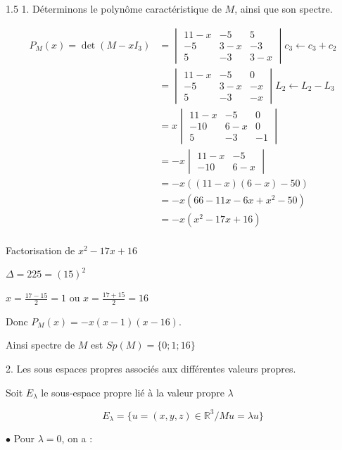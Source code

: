 \documentclass[12pt]{article}
\begin{document}
\begin{spacing}{1.5}
1. Déterminons le polynôme caractéristique de $M$, ainsi que son spectre.

\begin{align*}
P_M(x)=\det(M-xI_3)&=\begin{vmatrix}
11-x & -5 & 5 \\ 
-5 & 3-x & -3 \\ 
5 & -3 & 3-x
\end{vmatrix}c_3\leftarrow c_3+c_2\\
&=\begin{vmatrix}
11-x & -5 & 0 \\ 
-5 & 3-x & -x \\ 
5 & -3 & -x
\end{vmatrix}L_2\leftarrow L_2-L_3\\
&=x\begin{vmatrix}
11-x & -5 & 0 \\ 
-10 & 6-x & 0 \\ 
5 & -3 & -1
\end{vmatrix}\\
&=-x\begin{vmatrix}
11-x & -5 \\
-10 & 6-x 
\end{vmatrix}\\
&=-x((11-x)(6-x)-50)\\
&=-x(66-11x-6x+x^2-50)\\
&=-x(x^2-17x+16)\\
\end{align*}

Factorisation de $x^2-17x+16$

$\Delta=225=(15)^2$

$x=\frac{17-15}{2}=1$ ou $x=\frac{17+15}{2}=16$

Donc $P_M(x)=-x(x-1)(x-16)$.

Ainsi spectre de $M$ est $Sp(M)=\{0;1;16\}$

2. Les sous espaces propres associés aux différentes valeurs propres.

Soit $E_\lambda$ le sous-espace propre lié à la valeur propre $\lambda$

\[
E_\lambda=\{u=(x,y,z)\in \mathbb{R}^3/Mu=\lambda u\}
\]

\medskip
$\bullet$ Pour $\lambda=0$, on a :


\end{spacing}
\end{document}
